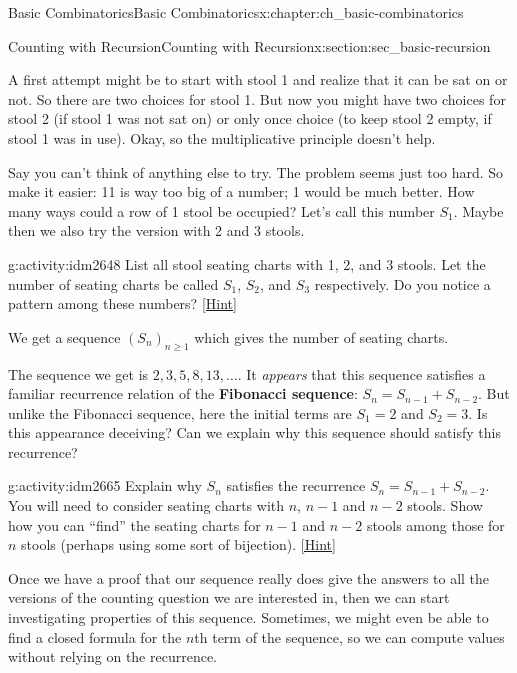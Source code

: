 \documentclass[oneside,10pt,]{book}
\newcommand{\terminology}[1]{\textbf{#1}}
\numberwithin{equation}{chapter}
\begin{document}
\begin{chapterptx}{Basic Combinatorics}{}{Basic Combinatorics}{}{}{x:chapter:ch_basic-combinatorics}
\begin{sectionptx}{Counting with Recursion}{}{Counting with Recursion}{}{}{x:section:sec_basic-recursion}
\begin{introduction}{}
\par
A first attempt might be to start with stool 1 and realize that it can be sat on or not.  So there are two choices for stool 1.  But now you might have two choices for stool 2 (if stool 1 was not sat on) or only once choice (to keep stool 2 empty, if stool 1 was in use).  Okay, so the multiplicative principle doesn't help.%
\par
Say you can't think of anything else to try.  The problem seems just too hard.  So make it easier:  11 is way too big of a number; 1 would be much better.  How many ways could a row of 1 stool be occupied?  Let's call this number \(S_1\).  Maybe then we also try the version with 2 and 3 stools.%
\begin{activity}{}{g:activity:idm2648}%
List all stool seating charts with 1, 2, and 3 stools.  Let the number of seating charts be called \(S_1\), \(S_2\), and \(S_3\) respectively.  Do you notice a pattern among these numbers?%
\space\hspace*{0pt}\hfill{\tiny\hyperlink{g:hint:idm2654-back}{[Hint]}}\end{activity}
We get a sequence \((S_n)_{n \ge 1}\) which gives the number of seating charts.%
\par
The sequence we get is \(2, 3, 5, 8, 13, \ldots\).  It \emph{appears} that this sequence satisfies a familiar recurrence relation of the \terminology{Fibonacci sequence}: \(S_n = S_{n-1} + S_{n-2}\).  But unlike the Fibonacci sequence, here the initial terms are \(S_1 = 2\) and \(S_2 = 3\).  Is this appearance deceiving?  Can we explain why this sequence should satisfy this recurrence?%
\begin{activity}{}{g:activity:idm2665}%
Explain why \(S_n\) satisfies the recurrence \(S_n = S_{n-1} + S_{n-2}\).  You will need to consider seating charts with \(n\), \(n-1\) and \(n-2\) stools.  Show how you can ``find'' the seating charts for \(n-1\) and \(n-2\) stools among those for \(n\) stools (perhaps using some sort of bijection).%
\space\hspace*{0pt}\hfill{\tiny\hyperlink{g:hint:idm2677-back}{[Hint]}}\end{activity}
Once we have a proof that our sequence really does give the answers to all the versions of the counting question we are interested in, then  we can start investigating properties of this sequence.  Sometimes, we might even be able to find a closed formula for the \(n\)th term of the sequence, so we can compute values without relying on the recurrence.%
\end{introduction}%

\end{sectionptx}
\end{chapterptx}
\end{document}
